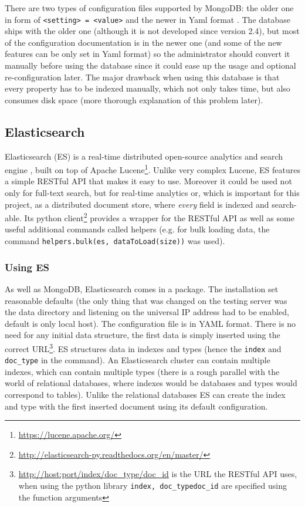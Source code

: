 There are two types
of configuration files supported by MongoDB: the older one in form of \texttt{<setting> = <value>} and the 
newer in Yaml format \cite{YAML}. The database ships with the older one (although it is not developed since version 2.4), but
most of the configuration documentation is in the newer one (and some of the new features can be only set in 
Yaml format) so the administrator should convert it manually before using the database since it could ease up
the usage and optional re-configuration later.
The major drawback when using this database is that every property has to be indexed manually, which not only 
takes time, but also consumes disk space (more thorough explanation of this problem later).


\subsection{Elasticsearch}

Elasticsearch (ES) is a real-time distributed open-source analytics and search engine \cite{ESBook}, 
built on top of Apache Lucene\footnote{\url{https://lucene.apache.org/}}. Unlike very complex Lucene, 
ES features a simple RESTful API that makes it easy to use. Moreover it could be used not only 
for full-text search, but for real-time analytics or, which is important for this project, as a 
distributed document store, where \textit{every} field is indexed and search-able. Its python 
client\footnote{\url{http://elasticsearch-py.readthedocs.org/en/master/}} provides a wrapper for the RESTful API
as well as some useful additional commands called helpers (e.g. for bulk loading data, the command 
\texttt{helpers.bulk(es, dataToLoad(size))} was used).

\subsubsection{Using ES}

As well as MongoDB, Elasticsearch comes in a package. The installation set reasonable 
defaults (the only thing that was changed on the testing server was the data directory and listening on the 
universal IP address had to be enabled, default is only local host). The 
configuration file is in YAML format. There is no need for any initial data structure,
the first data is simply inserted using the correct URL\footnote{\url{http://host:port/index/doc_type/doc_id}
is the URL the RESTful API uses, when using the python library \texttt{index, doc\_type}\texttt{doc\_id} are 
specified using the function arguments}. ES structures data in indexes and types (hence the \texttt{index} and
\texttt{doc\_type} in the command). An Elasticsearch cluster can contain multiple indexes, which can contain 
multiple types (there is a rough parallel with the world of relational databases, where indexes would be databases 
and types would correspond to tables). Unlike the relational databases ES can create the index and type with the 
first inserted document using its default configuration.

